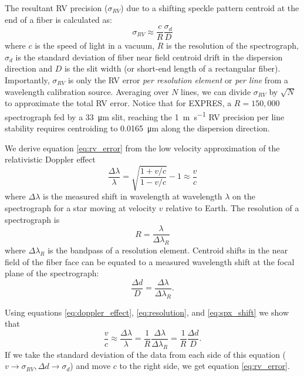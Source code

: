 \documentclass[twocolumn]{emulateapj}
\begin{document}
The resultant RV precision ($\sigma_{RV}$) due to a shifting speckle pattern centroid at the end of a fiber is calculated as:
\begin{equation}
\sigma_{RV} \approx \frac{c}{R} \frac{\sigma_d}{D}
\label{eq:rv_error}
\end{equation}
where $c$ is the speed of light in a vacuum, $R$ is the resolution of the spectrograph, $\sigma_d$ is the standard deviation of fiber near field centroid drift in the dispersion direction and $D$ is the slit width (or short-end length of a rectangular fiber). Importantly, $\sigma_{RV}$ is only the RV error \textit{per resolution element} or \textit{per line} from a wavelength calibration source. Averaging over $N$ lines, we can divide $\sigma_{RV}$ by $\sqrt{N}$ to approximate the total RV error. Notice that for EXPRES, a $R=150,000$ spectrograph fed by a \SI{33}{\micro\meter} slit, reaching the \SI{1}{\meter\per\second} RV precision per line stability requires centroiding to \SI{0.0165}{\micro\meter} along the dispersion direction.

We derive equation \ref{eq:rv_error} from the low velocity approximation of the relativistic Doppler effect
\begin{equation}
\frac{\Delta \lambda}{\lambda} = \sqrt{\frac{1 + v/c}{1-v/c}} - 1 \approx \frac{v}{c}
\label{eq:doppler_effect}
\end{equation}
where $\Delta \lambda$ is the measured shift in wavelength at wavelength $\lambda$ on the spectrograph for a star moving at velocity $v$ relative to Earth. The resolution of a spectrograph is
\begin{equation}
R = \frac{\lambda}{\Delta \lambda_R}
\label{eq:resolution}
\end{equation}
where $\Delta \lambda_R$ is the bandpass of a resolution element. Centroid shifts in the near field of the fiber face can be equated to a measured wavelength shift at the focal plane of the spectrograph:
\begin{equation}
\frac{\Delta d}{D} = \frac{\Delta \lambda}{\Delta \lambda_R}.
\label{eq:spx_shift}
\end{equation}

Using equations \ref{eq:doppler_effect}, \ref{eq:resolution}, and \ref{eq:spx_shift} we show that
\begin{equation}
\frac{v}{c} \approx \frac{\Delta \lambda}{\lambda} = \frac{1}{R} \frac{\Delta \lambda}{\Delta \lambda_R} = \frac{1}{R} \frac{\Delta d}{D}.
\end{equation}
If we take the standard deviation of the data from each side of this equation ($v \rightarrow \sigma_{RV}, \Delta d \rightarrow \sigma_d$) and move $c$ to the right side, we get equation \ref{eq:rv_error}.
\end{document}
